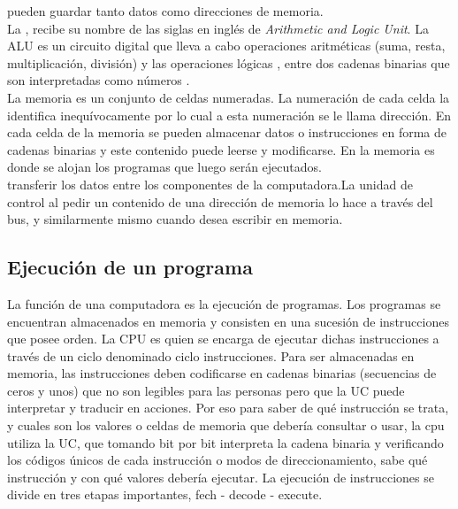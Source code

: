  pueden guardar tanto datos como direcciones de memoria.\\

La \ALU, recibe su nombre de las siglas en inglés de \textit{Arithmetic and Logic Unit}. La ALU es un circuito digital que lleva a cabo operaciones aritméticas (suma, resta, multiplicación, división) y las operaciones lógicas , entre dos cadenas binarias que son interpretadas como números .\\

La memoria es un conjunto de celdas numeradas. La numeración de cada celda la identifica inequívocamente por lo cual a esta numeración se le llama dirección. En cada celda de la memoria se pueden almacenar datos o instrucciones en forma de cadenas binarias y este contenido puede leerse y modificarse. En la memoria es donde se alojan los programas que luego serán ejecutados.\\

 transferir los datos entre los componentes de la computadora.La unidad de control al pedir un contenido de una dirección de memoria lo hace a través del bus, y similarmente mismo cuando desea escribir en memoria.

\subsection{Ejecución de un programa}

La función de una computadora es la ejecución de programas. Los programas se encuentran almacenados en memoria y consisten en una sucesión de instrucciones que posee orden. La CPU es quien se encarga de ejecutar dichas instrucciones a través de un ciclo denominado ciclo instrucciones. Para ser almacenadas en memoria, las instrucciones deben codificarse en cadenas binarias (secuencias de ceros y unos) que no son legibles para las personas pero que la UC puede interpretar y traducir en acciones. Por eso para saber de qué instrucción se trata, y cuales son los valores o celdas de memoria que debería consultar o usar, la cpu utiliza la UC, que tomando bit por bit interpreta la cadena binaria y verificando los códigos únicos de cada instrucción o modos de direccionamiento, sabe qué instrucción y con qué valores debería ejecutar. La ejecución de instrucciones se divide en tres etapas importantes, fech - decode - execute.

